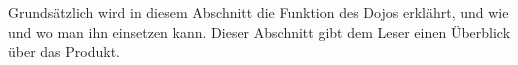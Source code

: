  Grundsätzlich wird in diesem Abschnitt die Funktion des Dojos erklährt, und wie und wo man ihn einsetzen kann. Dieser Abschnitt gibt dem Leser einen Überblick über das Produkt.
